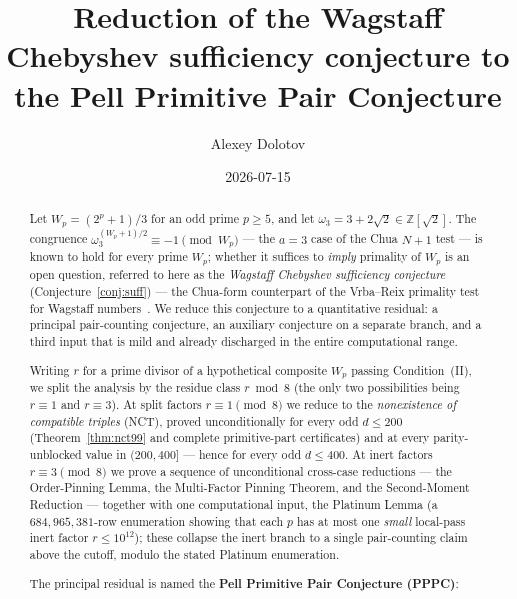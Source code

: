\documentclass[11pt]{amsart}
\theoremstyle{plain}
\theoremstyle{definition}
\theoremstyle{remark}
\numberwithin{equation}{section}
\newcommand{\Z}{\mathbb{Z}}
\begin{document}
\title[Wagstaff Chebyshev reduction to PPPC]{Reduction of the Wagstaff Chebyshev sufficiency conjecture to the Pell Primitive Pair Conjecture}

\author{Alexey Dolotov}
\date{2026-07-15}


\begin{abstract}
Let $W_p = (2^p + 1)/3$ for an odd prime $p \geq 5$, and let $\omega_3 = 3 + 2\sqrt{2} \in \Z[\sqrt 2]$. The congruence $\omega_3^{(W_p + 1)/2} \equiv -1 \pmod{W_p}$ --- the $a = 3$ case of the Chua $N + 1$ test --- is known to hold for every prime $W_p$; whether it suffices to \emph{imply} primality of $W_p$ is an open question, referred to here as the \emph{Wagstaff Chebyshev sufficiency conjecture} (Conjecture~\ref{conj:suff}) --- the Chua-form counterpart of the Vrba--Reix primality test for Wagstaff numbers~\cite{ref:VrbaReix}. We reduce this conjecture to a quantitative residual: a principal pair-counting conjecture, an auxiliary conjecture on a separate branch, and a third input that is mild and already discharged in the entire computational range.

Writing $r$ for a prime divisor of a hypothetical composite $W_p$ passing Condition~(II), we split the analysis by the residue class $r \bmod 8$ (the only two possibilities being $r \equiv 1$ and $r \equiv 3$). At split factors $r \equiv 1 \pmod 8$ we reduce to the \emph{nonexistence of compatible triples} (NCT), proved unconditionally for every odd $d \leq 200$ (Theorem~\ref{thm:nct99} and complete primitive-part certificates) and at every parity-unblocked value in $(200, 400]$ --- hence for every odd $d \leq 400$. At inert factors $r \equiv 3 \pmod 8$ we prove a sequence of unconditional cross-case reductions --- the Order-Pinning Lemma, the Multi-Factor Pinning Theorem, and the Second-Moment Reduction --- together with one computational input, the Platinum Lemma (a $684{,}965{,}381$-row enumeration showing that each $p$ has at most one \emph{small} local-pass inert factor $r \leq 10^{12}$); these collapse the inert branch to a single pair-counting claim above the cutoff, modulo the stated Platinum enumeration.

The principal residual is named the \textbf{Pell Primitive Pair Conjecture (PPPC)}:


\end{abstract}
\end{document}
